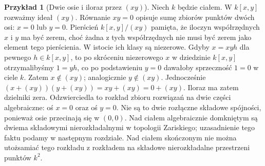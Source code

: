 \documentclass[11pt,a4paper,openany]{report}
\numberwithin{equation}{section}
\theoremstyle{plain}
\theoremstyle{definition}
\newtheorem{przyklad}[twierdzenie]{Przykład}
\theoremstyle{remark}
\newcommand{\R}{\mathbb R}
\begin{document}
\begin{przyklad}[Dwie osie i iloraz przez $(xy)$]
Niech $k$ będzie ciałem. W $k[x,y]$ rozważmy ideał $(xy)$.
Równanie $xy=0$ opisuje sumę zbiorów punktów dwóch osi: $x=0$ lub $y=0$.
Pierścień $k[x,y]/(xy)$ pamięta, że iloczyn współrzędnych $x$ i $y$
ma być zerem, choć żadna z tych współrzędnych nie musi być zerem
jako element tego pierścienia.
W istocie ich klasy są niezerowe. Gdyby $x=xyh$ dla pewnego
$h\in k[x,y]$, to po skróceniu niezerowego $x$ w dziedzinie
$k[x,y]$ otrzymalibyśmy $1=yh$, co po podstawieniu $y=0$
dawałoby sprzeczność $1=0$ w ciele $k$. Zatem $x\notin(xy)$;
analogicznie $y\notin(xy)$. Jednocześnie
$(x+(xy))(y+(xy))=xy+(xy)=0+(xy)$.
Iloraz ma zatem dzielniki zera. Odzwierciedla to rozkład zbioru
rozwiązań na dwie części algebraiczne: oś $x=0$ oraz oś $y=0$.
Nie są to dwie rozłączne składowe spójności, ponieważ osie
przecinają się w $(0,0)$. Nad ciałem algebraicznie domkniętym
są dwiema składowymi nierozkładalnymi w topologii Zariskiego;
uzasadnienie tego faktu podamy w następnym rozdziale.
Nad ciałem skończonym nie można utożsamiać tego rozkładu
z rozkładem na składowe nierozkładalne przestrzeni punktów $k^2$.
\end{przyklad}

\begin{center}
\end{center}
\end{document}
